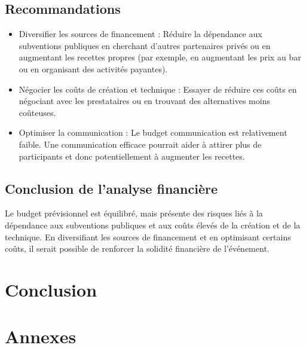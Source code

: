 \documentclass[12pt,a4paper]{report}
\begin{document}
\section{Recommandations}
\begin{itemize}
\item Diversifier les sources de financement : Réduire la dépendance aux subventions publiques en cherchant d'autres partenaires privés ou en augmentant les recettes propres (par exemple, en augmentant les prix au bar ou en organisant des activités payantes).
\item Négocier les coûts de création et technique : Essayer de réduire ces coûts en négociant avec les prestataires ou en trouvant des alternatives moins coûteuses.
\item Optimiser la communication : Le budget communication est relativement faible. Une communication efficace pourrait aider à attirer plus de participants et donc potentiellement à augmenter les recettes.
\end{itemize}

\section{Conclusion de l'analyse financière}
Le budget prévisionnel est équilibré, mais présente des risques liés à la dépendance aux subventions publiques et aux coûts élevés de la création et de la technique. En diversifiant les sources de financement et en optimisant certains coûts, il serait possible de renforcer la solidité financière de l'événement.

\chapter{Conclusion}

\chapter*{Annexes}
\listoftables
\end{document}
